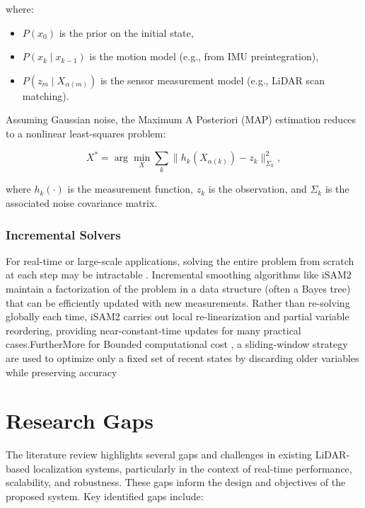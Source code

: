 where:
\begin{itemize}
    \item $P(x_0)$ is the prior on the initial state,
    \item $P(x_k \mid x_{k-1})$ is the motion model (e.g., from IMU preintegration),
    \item $P(z_m \mid X_{\alpha(m)})$ is the sensor measurement model (e.g., LiDAR scan matching).
\end{itemize}

Assuming Gaussian noise, the Maximum A Posteriori (MAP) estimation reduces to a nonlinear least-squares problem:

\begin{equation}
X^* = \arg\min_X \sum_k \| h_k(X_{\alpha(k)}) - z_k \|_{\Sigma_k}^2,
\label{eq:fg_map}
\end{equation}

where $h_k(\cdot)$ is the measurement function, $z_k$ is the observation, and $\Sigma_k$ is the associated noise covariance matrix.

\subsubsection{Incremental Solvers}
For real-time or large-scale applications, solving the entire problem from scratch at each step may be intractable \cite{thrun2005probabilistic}. Incremental smoothing algorithms like iSAM2 \cite{kaess2012isam2} maintain a factorization of the problem in a data structure (often a Bayes tree) that can be efficiently updated with new measurements. Rather than re-solving globally each time, iSAM2 carries out local re-linearization and partial variable reordering, providing near-constant-time updates for many practical cases.FurtherMore for Bounded computational cost , a sliding-window strategy are used to optimize only a fixed set of recent states by discarding older variables while preserving accuracy~\cite{herbert2013fusion}


\section{Research Gaps}
\label{sec:gap}
The literature review highlights several gaps and challenges in existing LiDAR-based localization systems, particularly in the context of real-time performance, scalability, and robustness. These gaps inform the design and objectives of the proposed system. Key identified gaps include:

